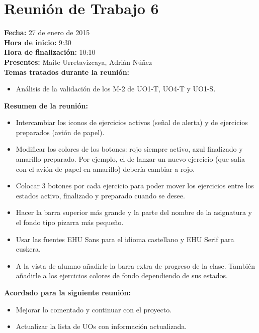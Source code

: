 \section*{Reunión de Trabajo 6}

\textbf{Fecha:} 27 de enero de 2015\\

\textbf{Hora de inicio:} 9:30\\

\textbf{Hora de finalización:} 10:10\\

\textbf{Presentes:} Maite Urretavizcaya, Adrián Núñez\\

\textbf{Temas tratados durante la reunión:}

\begin{itemize}
\item Análisis de la validación de los M-2 de UO1-T, UO4-T y UO1-S.
\end{itemize}

\textbf{Resumen de la reunión:}

\begin{itemize}
\item Intercambiar los iconos de ejercicios activos (señal de alerta) y de ejercicios preparados (avión de papel).

\item Modificar los colores de los botones: rojo siempre activo, azul finalizado y amarillo preparado. Por ejemplo, el de lanzar un nuevo ejercicio (que salia con el avión de papel en amarillo) debería cambiar a rojo.

\item Colocar 3 botones por cada ejercicio para poder mover los ejercicios entre los estados activo, finalizado y preparado cuando se desee.

\item Hacer la barra superior más grande y la parte del nombre de la asignatura y el fondo tipo pizarra más pequeño.

\item Usar las fuentes EHU Sans para el idioma castellano y EHU Serif para euskera.

\item A la vista de alumno añadirle la barra extra de progreso de la clase. También añadirle a los ejercicios colores de fondo dependiendo de sus estados.
\end{itemize}

\textbf{Acordado para la siguiente reunión:}

\begin{itemize}
\item Mejorar lo comentado y continuar con el proyecto.

\item Actualizar la lista de UOs con información actualizada.
\end{itemize}